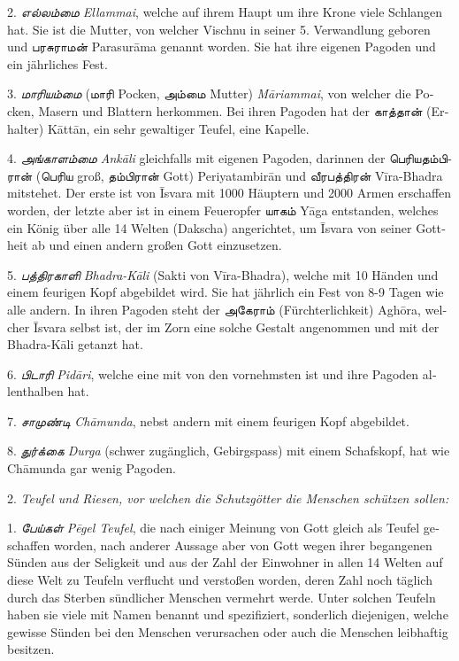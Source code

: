 \documentclass{article}
\newcommand{\TamilText}[1]{\texttamil{#1}}
\newcommand{\TamilItalic}[1]{\texttamil{\emph{#1}}}
\newcommand{\tam}[1]{\TamilText{#1}}
\newcommand{\tamitalic}[1]{\TamilItalic{#1}}
\begin{document}
{2. \tamitalic{எல்லம்மை} \emph{\textgerman{Ellammai}}, \textgerman{welche auf ihrem Haupt um ihre Krone viele Schlangen hat. Sie ist die Mutter, von welcher Vischnu in seiner 5. Verwandlung geboren und \tam{பரசுராமன்} Parasur\={a}ma genannt worden. Sie hat ihre eigenen Pagoden und ein jährliches Fest.}

3. \tamitalic{மாரியம்மை} (\tam{மாரி} \textgerman{Pocken}, \tam{அம்மை} \textgerman{Mutter) \emph{M\={a}riammai}, von welcher die Pocken, Masern und Blattern herkommen. Bei ihren Pagoden hat der \tam{காத்தான்} (Erhalter) K\={a}tt\={a}n, ein sehr gewaltiger Teufel, eine Kapelle.}

4. \tamitalic{அங்காளம்மை} \emph{\textgerman{Ank\={a}li}} \textgerman{gleichfalls mit eigenen Pagoden, darinnen der \tam{பெரியதம்பிரான்} (\tam{பெரிய} groß, \tam{தம்பிரான்} Gott) Periyatambir\={a}n und \tam{வீரபத்திரன்} V\={i}ra-Bhadra mitstehet. Der erste ist von \={I}svara mit 1000 Häuptern und 2000 Armen erschaffen worden, der letzte aber ist in einem Feueropfer \tam{யாகம்} Y\={a}ga entstanden, welches ein König über alle 14 Welten (Dakscha) angerichtet, um \={I}svara von seiner Gottheit ab und einen andern großen Gott einzusetzen.}

5. \tamitalic{பத்திரகாளி} \emph{\textgerman{Bhadra-K\={a}li}} \textgerman{(Sakti von V\={i}ra-Bhadra), welche mit 10 Händen und einem feurigen Kopf abgebildet wird. Sie hat jährlich ein Fest von 8-9 Tagen wie alle andern. In ihren Pagoden steht der \tam{அகேராம்} (Fürchterlichkeit) Agh\={o}ra, welcher \={I}svara selbst ist, der im Zorn eine solche Gestalt angenommen und mit der Bhadra-K\={a}li getanzt hat.}

6. \tamitalic{பிடாரி} \emph{\textgerman{Pid\={a}ri}}, \textgerman{welche eine mit von den vornehmsten ist und ihre Pagoden allenthalben hat.}

7. \tamitalic{சாமுண்டி} \emph{\textgerman{Ch\={a}munda}}, \textgerman{nebst andern mit einem feurigen Kopf abgebildet.}

8. \tamitalic{துர்க்கை} \emph{\textgerman{Durga}} \textgerman{(schwer zugänglich, Gebirgspass) mit einem Schafskopf, hat wie Ch\={a}munda gar wenig Pagoden.}

\bigskip

2. \emph{\textgerman{Teufel und Riesen, vor welchen die Schutzgötter die Menschen schützen sollen:}}

\bigskip

1. \tamitalic{பேய்கள்} \emph{\textgerman{P\={e}gel Teufel}}, \textgerman{die nach einiger Meinung von Gott gleich als Teufel geschaffen worden, nach anderer Aussage aber von Gott wegen ihrer begangenen Sünden aus der Seligkeit und aus der Zahl der Einwohner in allen 14 Welten auf diese Welt zu Teufeln verflucht und verstoßen worden, deren Zahl noch täglich durch das Sterben sündlicher Menschen vermehrt werde. Unter solchen Teufeln haben sie viele mit Namen benannt und spezifiziert, sonderlich diejenigen, welche gewisse Sünden bei den Menschen verursachen oder auch die Menschen leibhaftig besitzen.}

}
\end{document}
